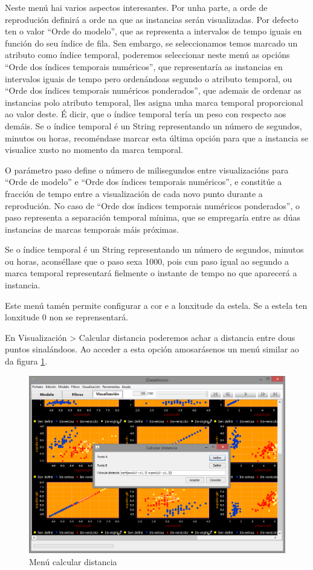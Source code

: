 Neste menú hai varios aspectos interesantes. Por unha parte, a orde de reprodución definirá a orde na que as instancias serán visualizadas. Por defecto ten o valor ``Orde do modelo'', que as representa a intervalos de tempo iguais en función do seu índice de fila. Sen embargo, se seleccionamos temos marcado un atributo como índice temporal, poderemos seleccionar neste menú as opcións ``Orde dos índices temporais numéricos'', que representaría as instancias en intervalos iguais de tempo pero ordenándoas segundo o atributo temporal, ou ``Orde dos índices temporais numéricos ponderados'', que ademais de ordenar as instancias polo atributo temporal, lles asigna unha marca temporal proporcional ao valor deste. É dicir, que o índice temporal tería un peso con respecto aos demáis. Se o índice temporal é un String representando un número de segundos, minutos ou horas, recoméndase marcar esta última opción para que a instancia se visualice xusto no momento da marca temporal.

O parámetro paso define o número de milisegundos entre visualizacións para ``Orde de modelo'' e ``Orde dos índices temporais numéricos'', e constitúe a fracción de tempo entre a visualización de cada novo punto durante a reprodución. No caso de ``Orde dos índices temporais numéricos ponderados'', o paso representa a separación temporal mínima, que se empregaría entre as dúas instancias de marcas temporais máis próximas.

Se o índice temporal é un String representando un número de segundos, minutos ou horas, aconséllase que o paso sexa 1000, pois cun paso igual ao segundo a marca temporal representará fielmente o instante de tempo no que aparecerá a instancia.

Este menú tamén permite configurar a cor e a lonxitude da estela. Se a estela ten lonxitude 0 non se reprensentará.

En Visualización \textgreater{} Calcular distancia poderemos achar a distancia entre dous puntos sinalándoos. Ao acceder a esta opción amosarásenos un menú similar ao da figura \ref{calcularDistancia}.

\begin{figure}
\centering
\includegraphics[width=\textwidth,height=\textheight,keepaspectratio]{figuras/calcularDistancia}
\caption{Menú calcular distancia}
\label{calcularDistancia}
\end{figure}

